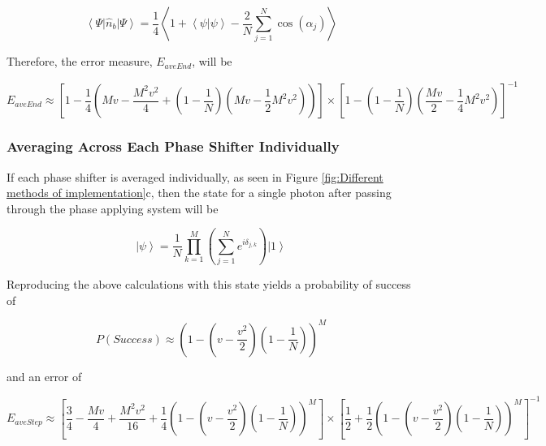 \documentclass[aps,pra,twocolumn,superscriptaddress,numerical]{revtex4-1}
\begin{document}
		\begin{equation}
		\left\langle \Psi\right|\hat{n}_{b}\left|\Psi\right\rangle = \frac{1}{4}\left\langle 1+\left\langle \psi|\psi\right\rangle -\frac{2}{N}\sum_{j=1}^{N}\cos\left(\alpha_{j}\right)\right\rangle 
		\end{equation}
		
		
		Therefore, the error measure, $E_{aveEnd}$, will be
		
		\begin{widetext}
			\begin{equation}
			E_{aveEnd}  \approx  \left[1-\frac{1}{4}\left(Mv-\frac{M^{2}v^{2}}{4}+\left(1-\frac{1}{N}\right)\left(Mv-\frac{1}{2}M^{2}v^{2}\right)\right)\right]\nonumber\times\left[1-\left(1-\frac{1}{N}\right)\left(\frac{Mv}{2}-\frac{1}{4}M^{2}v^{2}\right)\right]^{-1}\label{eq:ErrorAvEnd}
			\end{equation}
		\end{widetext}
		
		
		\subsubsection{Averaging Across Each Phase Shifter Individually\label{Averaging Across Each Phase Shifter Individually}}
		
		If each phase shifter is averaged individually, as seen in Figure \ref{fig:Different methods of implementation}c, then the state for a single photon after passing through the phase applying system will be
		
		\begin{equation}
		\left|\psi\right\rangle =\frac{1}{N}\prod_{k=1}^{M}\left(\sum_{j=1}^{N}e^{i\delta_{j,k}}\right)\left|1\right\rangle \label{eq:AveStepPhaseState}
		\end{equation}
		
		
		Reproducing the above calculations with this state yields a probability of success of
		
		\begin{equation}
		P\left(Success\right)\approx\left(1-\left(v-\frac{v^{2}}{2}\right)\left(1-\frac{1}{N}\right)\right)^{M}\label{eq:AvStepProbSuccess}
		\end{equation}
		
		
		and an error of
		
		\begin{widetext}
			\begin{equation}
			E_{aveStep} \approx  \left[\frac{3}{4}-\frac{Mv}{4}+\frac{M^{2}v^{2}}{16}+\frac{1}{4}\left(1-\left(v-\frac{v^{2}}{2}\right)\left(1-\frac{1}{N}\right)\right)^{M}\right]\nonumber\times\left[\frac{1}{2}+\frac{1}{2}\left(1-\left(v-\frac{v^{2}}{2}\right)\left(1-\frac{1}{N}\right)\right)^{M}\right]^{-1}\label{eq:ErrorAvStep}
			\end{equation}
		\end{widetext}	
		
\end{document}
